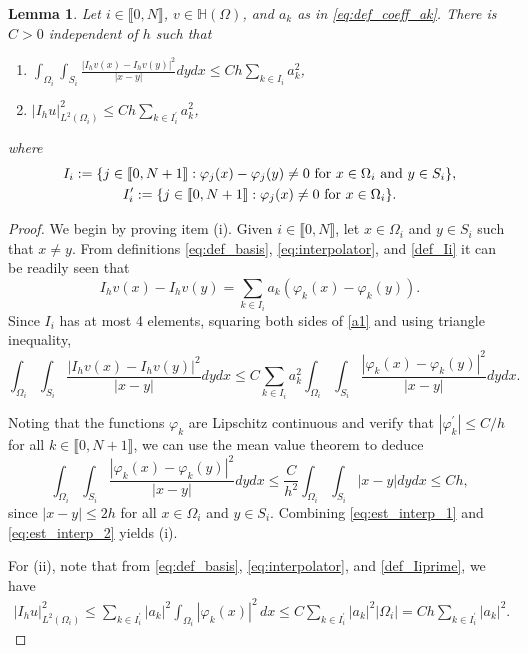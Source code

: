 \documentclass[10 pt]{article}
\newcommand\inter[1]{\llbracket #1\rrbracket}
\newtheorem{lemma}[theorem]{Lemma}
\numberwithin{equation}{section}
\begin{document}
\begin{lemma}\label{lem:loc_norm_interp}
Let $i\in\inter{0,N}$, $v\in \mathbb H(\Omega)$, and $a_k$ as in \eqref{eq:def_coeff_ak}.  There is $C>0$ independent of $h$ such that
%
\begin{enumerate}[label=\upshape(\roman*)]
\item $\displaystyle \int_{\Omega_i}\int_{S_i}\frac{|I_hv(x)-I_hv(y)|^2}{|x-y|}dy dx\leq Ch\sum_{k\in I_i} a_k^2$,
\item  $\displaystyle |I_h u|^2_{L^2(\Omega_i)}\leq Ch\sum_{k\in I_i^\prime} a_k^2$,
\end{enumerate}
where
%
\begin{gather}\label{def_Ii}
I_i:=\{j\in\inter{0,N+1}:\varphi_j(x)-\varphi_j(y) \neq 0 \ \textnormal{for $x\in \Omega_i$ and $y\in S_i$}\}, \\ \label{def_Iiprime}
I^\prime_i:=\{j\in\inter{0,N+1}:\varphi_j(x)\neq 0 \ \textnormal{for $x\in \Omega_i$}\}.
\end{gather}
%
\end{lemma}
\begin{proof}
We begin by proving item (i). Given $i\in\inter{0,N}$, let $x\in \Omega_i$ and $y\in S_i$ such that $x\neq y$.  From definitions \eqref{eq:def_basis}, \eqref{eq:interpolator}, and \eqref{def_Ii} it can be readily seen that
%
\begin{equation}\label{a1}
    I_hv(x)-I_hv(y)=\sum_{k\in I_i} a_k(\varphi_k(x)-\varphi_k(y)).
\end{equation}
%
Since $I_i$ has at most 4 elements, squaring both sides of \eqref{a1} and using triangle inequality,
%
\begin{equation}\label{eq:est_interp_1}
    \int_{\Omega_i}\int_{S_i}\frac{|I_hv(x)- I_hv(y)|^2}{|x-y|} dy dx \leq C \sum_{k\in I_i} a_k^2\int_{\Omega_i}\int_{S_i} \frac{|\varphi_k(x)- \varphi_k(y)|^2}{|x-y|} dy dx.
\end{equation}
%

Noting that the functions $\varphi_k$ are Lipschitz continuous and verify that $|\varphi_k^\prime|\leq C/h$ for all $k\in\inter{0,N+1}$, we can use the mean value theorem to deduce
%
\begin{equation}\label{eq:est_interp_2}
    \int_{\Omega_i}\int_{S_i}\frac{|\varphi_k(x)-\varphi_k(y)|^2}{|x-y|}dy dx \leq \frac{C}{h^2}\int_{\Omega_i}\int_{S_i}|x-y|dy dx \leq Ch,
\end{equation}
%
since $|x-y|\leq 2h$ for all $x\in \Omega_i$ and $y\in S_i$. Combining \eqref{eq:est_interp_1} and \eqref{eq:est_interp_2} yields (i). 

For (ii), note that from \eqref{eq:def_basis}, \eqref{eq:interpolator}, and \eqref{def_Iiprime}, we have
\begin{align*}
|I_h u|^2_{L^2(\Omega_i)}
\leq \sum_{k\in I_i^\prime}|a_k|^2\int_{\Omega_i}|\varphi_k(x)|^2\, dx
\leq C\sum_{k\in I_i^\prime}|a_k|^2|\Omega_i|
=Ch\sum_{k\in I_i^\prime}|a_k|^2.
\end{align*}
%
\end{proof}
\end{document}

